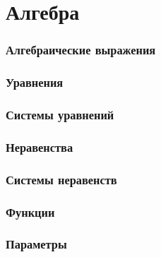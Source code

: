 \part{Алгебра}
\section{Алгебраические выражения}
	
\section{Уравнения}
	
\section{Системы уравнений}
	
\section{Неравенства}
\section{Системы неравенств}
\section{Функции}
	
\section{Параметры}

